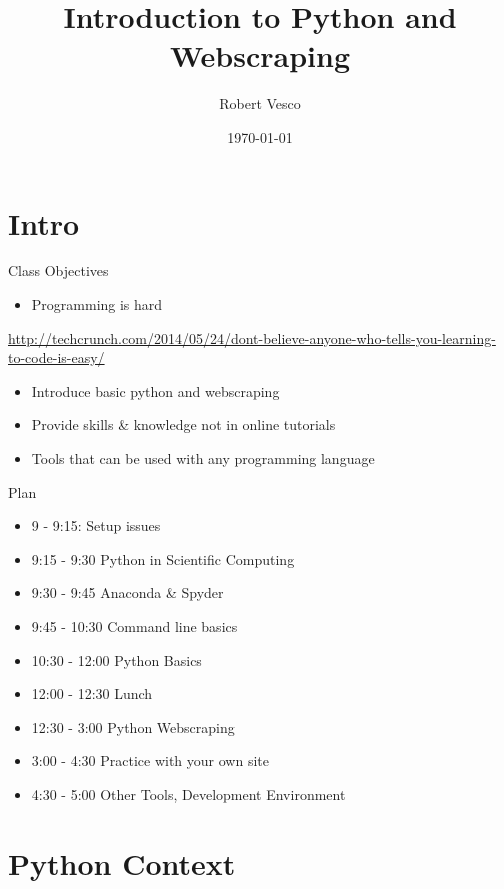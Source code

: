 \documentclass[presentation]{beamer}
\institute[Yale]{Yale School of Management}
\author{Robert Vesco}
\date{\today}
\title{Introduction to Python and Webscraping}
\begin{document}
\maketitle

\section{Intro}
\label{sec-1}

\begin{frame}[label=sec-1-0-1]{Class Objectives}
\begin{itemize}
\item Programming is hard
\end{itemize}
\url{http://techcrunch.com/2014/05/24/dont-believe-anyone-who-tells-you-learning-to-code-is-easy/}

\begin{itemize}
\item Introduce basic python and webscraping
\item Provide skills \& knowledge not in online tutorials
\item Tools that can be used with any programming language
\end{itemize}
\end{frame}


\begin{frame}[label=sec-1-0-2]{Plan}
\begin{itemize}
\item 9 - 9:15: Setup issues
\item 9:15 - 9:30 Python in Scientific Computing
\item 9:30 - 9:45 Anaconda \& Spyder
\item 9:45 - 10:30 Command line basics
\item 10:30 - 12:00 Python Basics
\item 12:00 - 12:30 Lunch
\item 12:30 - 3:00 Python Webscraping
\item 3:00 - 4:30 Practice with your own site
\item 4:30 - 5:00 Other Tools, Development Environment
\end{itemize}
\end{frame}


\section{Python Context}
\label{sec-2}
\end{document}
